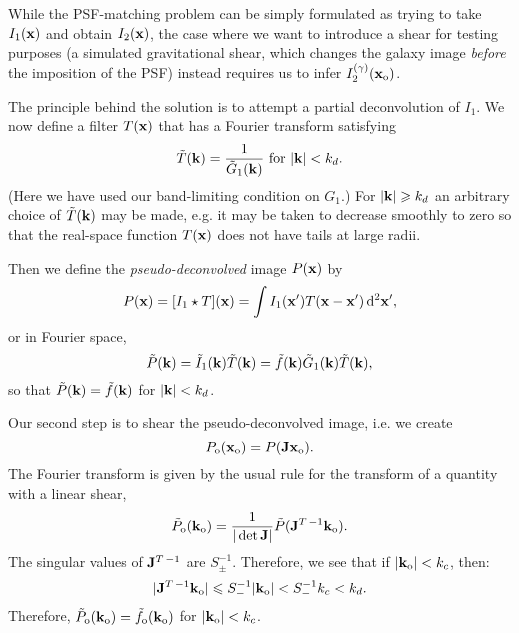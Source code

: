 \documentclass[twocolumn,useAMS,usenatbib]{mn2e}
\newcommand{\beq}{\begin{equation}}
\newcommand{\eeq}{\end{equation}}
\newcommand{\rmd}{\mathrm{d}}
\begin{document}
While the PSF-matching problem can be simply formulated as trying to
take $I_1({\bf x})$ and obtain $I_2({\bf x})$, the case where we want
to introduce a shear for testing purposes (a simulated gravitational
shear, which changes the galaxy image {\em before} the imposition of
the PSF) instead requires us to infer $I_2^{(\gamma)}({\bf x}_{\rm o})$.

The principle behind the solution is to attempt a partial
deconvolution of $I_1$.  We now define a filter $T({\bf x})$ that has
a Fourier transform satisfying
\beq
\tilde T({\bf k}) = \frac1{\tilde G_1({\bf k})} \,\, {\rm for}\,\,
|{\bf k}|<k_d.
\eeq
(Here we have used our band-limiting condition on $G_1$.)  For $|{\bf k}|\ge k_d$ an arbitrary choice of $\tilde T({\bf k})$ may be made, e.g. it may be taken to 
decrease smoothly to 
zero so that the real-space function $T({\bf x})$ does not have tails at large radii.

Then we define the {\em pseudo-deconvolved} image $P({\bf x})$ by
\beq\label{E:pdconvimg}
P({\bf x}) = [I_1\star T]({\bf x}) = \int I_1({\bf x}')T({\bf x}-{\bf x}')\,\rmd^2{\bf x}',
\eeq
or in Fourier space,
\beq\label{E:fpdconvimg}
\tilde P({\bf k}) = \tilde I_1({\bf k})\tilde T({\bf k}) = \tilde f({\bf k}) \tilde G_1({\bf k}) \tilde T({\bf k}),
\eeq
so that $\tilde P({\bf k}) = \tilde f({\bf k})$ for $|{\bf k}|<k_d$.

Our second step is to shear the pseudo-deconvolved image, i.e. we create
\beq
P_{\rm o}({\bf x}_{\rm o}) = P({\bf Jx}_{\rm o}).
\eeq
The Fourier transform is given by the usual rule for the transform of a quantity with a linear shear,
\beq\label{E:linshearft}
\tilde P_{\rm o}({\bf k}_{\rm o}) = \frac1{|\det{\bf J}|}\tilde P({\bf J}^{T\,-1}{\bf k}_{\rm o}).
\eeq
The singular values of ${\bf J}^{T\,-1}$ are $S_\pm^{-1}$.
Therefore, we see that if $|{\bf k}_{\rm o}|<k_c$, then:
\beq
|{\bf J}^{T\,-1}{\bf k}_{\rm o}|\le S_-^{-1}|{\bf k}_{\rm o}|<S_-^{-1}k_c<k_d.
\eeq
Therefore,
$\tilde P_{\rm o}({\bf k}_{\rm o}) =\tilde f_{\rm o}({\bf k}_{\rm o})$ for $|{\bf k}_{\rm o}|<k_c$.
\end{document}

